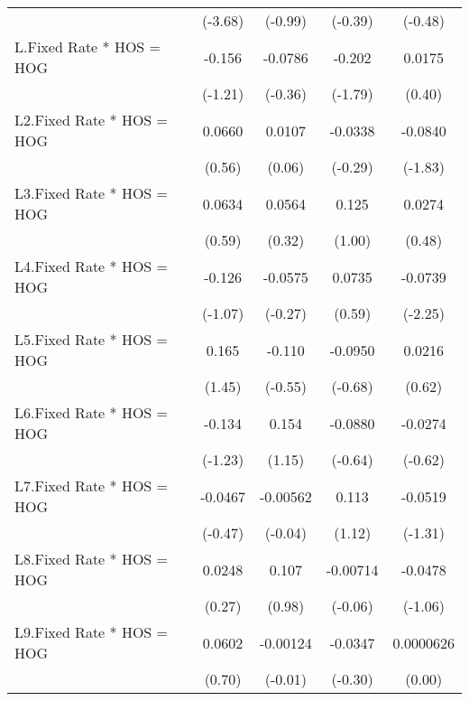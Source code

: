 {\begin{longtable}{l*{4}{c}}
                &  (-3.68)         &  (-0.99)         &  (-0.39)         &  (-0.48)         \\
[1em]
L.Fixed Rate * HOS = HOG&   -0.156         &  -0.0786         &   -0.202         &   0.0175         \\
                &  (-1.21)         &  (-0.36)         &  (-1.79)         &   (0.40)         \\
[1em]
L2.Fixed Rate * HOS = HOG&   0.0660         &   0.0107         &  -0.0338         &  -0.0840         \\
                &   (0.56)         &   (0.06)         &  (-0.29)         &  (-1.83)         \\
[1em]
L3.Fixed Rate * HOS = HOG&   0.0634         &   0.0564         &    0.125         &   0.0274         \\
                &   (0.59)         &   (0.32)         &   (1.00)         &   (0.48)         \\
[1em]
L4.Fixed Rate * HOS = HOG&   -0.126         &  -0.0575         &   0.0735         &  -0.0739\sym{*}  \\
                &  (-1.07)         &  (-0.27)         &   (0.59)         &  (-2.25)         \\
[1em]
L5.Fixed Rate * HOS = HOG&    0.165         &   -0.110         &  -0.0950         &   0.0216         \\
                &   (1.45)         &  (-0.55)         &  (-0.68)         &   (0.62)         \\
[1em]
L6.Fixed Rate * HOS = HOG&   -0.134         &    0.154         &  -0.0880         &  -0.0274         \\
                &  (-1.23)         &   (1.15)         &  (-0.64)         &  (-0.62)         \\
[1em]
L7.Fixed Rate * HOS = HOG&  -0.0467         & -0.00562         &    0.113         &  -0.0519         \\
                &  (-0.47)         &  (-0.04)         &   (1.12)         &  (-1.31)         \\
[1em]
L8.Fixed Rate * HOS = HOG&   0.0248         &    0.107         & -0.00714         &  -0.0478         \\
                &   (0.27)         &   (0.98)         &  (-0.06)         &  (-1.06)         \\
[1em]
L9.Fixed Rate * HOS = HOG&   0.0602         & -0.00124         &  -0.0347         &0.0000626         \\
                &   (0.70)         &  (-0.01)         &  (-0.30)         &   (0.00)         \\

\end{longtable}}
